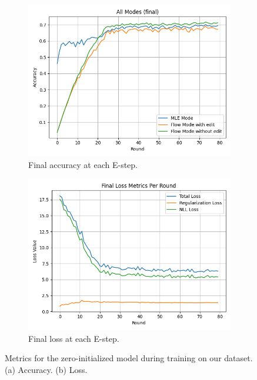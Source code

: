 \begin{figure}[H]
    \centering
    \begin{subfigure}[b]{0.46\textwidth}
        \centering
        \includegraphics[width=\textwidth]{Images/final_accuracy_all_modes.png}
        \caption{Final accuracy at each E-step.}
        \label{fig:final-acc-all}
    \end{subfigure}\hfill
    \begin{subfigure}[b]{0.46\textwidth}
        \centering
        \includegraphics[width=\textwidth]{Images/final_loss_all_metrics.png}
        \caption{Final loss at each E-step.}
        \label{fig:final-loss-all}
    \end{subfigure}
    \caption{Metrics for the zero-initialized model during training on our dataset. \\
    (a) Accuracy. (b) Loss.}
    \label{fig:acc-loss-all}
\end{figure}

